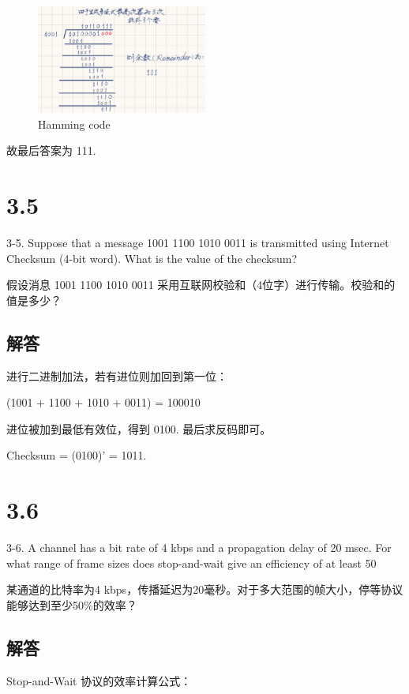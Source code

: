 \begin{figure}[H]
  \centering
  \includegraphics[width=0.5\textwidth]{lec3/Hamming.png}
  \caption{Hamming code}
\end{figure}

故最后答案为 111.

\section{3.5}

3-5. Suppose that a message 1001 1100 1010 0011 is transmitted using Internet Checksum (4-bit word). What is the value of the checksum?

假设消息 1001 1100 1010 0011 采用互联网校验和（4位字）进行传输。校验和的值是多少？

\subsection*{解答}

进行二进制加法，若有进位则加回到第一位：

(1001 + 1100 + 1010 + 0011) = 100010

进位被加到最低有效位，得到 0100.
最后求反码即可。

Checksum = (0100)' = 1011.

\section{3.6}

3-6. A channel has a bit rate of 4 kbps and a propagation delay of 20 msec. For what range of frame sizes does stop-and-wait give an efficiency of at least 50%

某通道的比特率为4 kbps，传播延迟为20毫秒。对于多大范围的帧大小，停等协议能够达到至少50\%的效率？

\subsection*{解答}

Stop-and-Wait 协议的效率计算公式：

